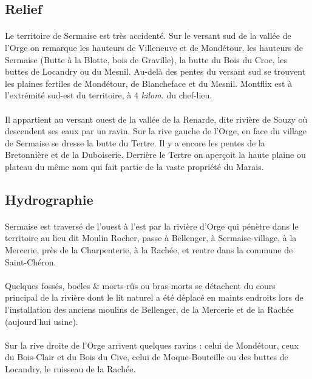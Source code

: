 \documentclass[../eBook.tex]{subfiles}
\begin{document}
  \subsection*{Relief}
    \paragraph{}Le territoire de Sermaise est très accidenté. Sur le versant sud de la vallée de l'Orge on remarque les hauteurs de Villeneuve et de Mondétour, les hauteurs de Sermaise (Butte à la Blotte, bois de Graville), la butte du Bois du Croc, les buttes de Locandry ou du Mesnil. Au-delà des pentes du versant sud se trouvent les plaines fertiles de Mondétour, de Blancheface et du Mesnil. Montflix est à l'extrémité sud-est du territoire, à 4 \textit{kilom.} du chef-lieu.
    \paragraph{}Il appartient au versant ouest de la vallée de la Renarde, dite rivière de Souzy où descendent ses eaux par un ravin. Sur la rive gauche de l'Orge, en face du village de Sermaise se dresse la butte du Tertre. Il y a encore les pentes de la Bretonnière et de la Duboiserie. Derrière le Tertre on aperçoit la haute plaine ou plateau du même nom qui fait partie de la vaste propriété du Marais.

  \subsection*{Hydrographie}
    \paragraph{}Sermaise est traversé de l'ouest à l'est par la rivière d'Orge qui pénètre dans le territoire au lieu dit Moulin Rocher, passe à Bellenger, à Sermaise-village, à la Mercerie, près de la Charpenterie, à la Rachée, et rentre dans la commune de Saint-Chéron.
    \paragraph{}Quelques fossés, boëles \& morts-rûs ou bras-morts se détachent du cours principal de la rivière dont le lit naturel a été déplacé en maints endroits lors de l'installation des anciens moulins de Bellenger, de la Mercerie et de la Rachée (aujourd'hui usine).
    \paragraph{}Sur la rive droite de l'Orge arrivent quelques ravins : celui de Mondétour, ceux du Bois-Clair et du Bois du Cive, celui de Moque-Bouteille ou des buttes de Locandry, le ruisseau de la Rachée.
\end{document}
